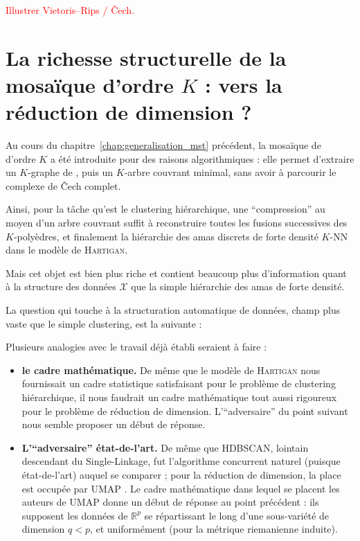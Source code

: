\textcolor{red}{Illustrer Vietoris--Rips / \v Cech.}



\section{La richesse structurelle de la mosaïque d'ordre $K$ : vers la réduction de dimension ?}
\label{sec:chapV_reduction_dimension}

Au cours du chapitre~\ref{chap:generalisation_mst} précédent, la mosaïque de  d'ordre $K$ a été introduite pour des raisons algorithmiques : elle permet d'extraire un $K$-graphe de , puis un $K$-arbre couvrant minimal, sans avoir à parcourir le complexe de \v Cech complet. 

Ainsi, pour la tâche qu'est le clustering hiérarchique, une ``compression'' au moyen d'un arbre couvrant suffit à reconstruire toutes les fusions successives des $K$-polyèdres, et finalement la hiérarchie des amas discrets de forte densité $K$-NN dans le modèle de \textsc{Hartigan}.

Mais cet objet est bien plus riche et contient beaucoup plus d'information quant à la structure des données $\mathcal X$ que la simple hiérarchie des amas de forte densité.

La question qui touche à la structuration automatique de données, champ plus vaste que le simple clustering, est la suivante :


Plusieurs analogies avec le travail déjà établi seraient à faire :
\begin{itemize}
    \item \textbf{le cadre mathématique.} De même que le modèle de \textsc{Hartigan} nous fournissait un cadre statistique satisfaisant pour le problème de clustering hiérarchique, il nous faudrait un cadre mathématique tout aussi rigoureux pour le problème de réduction de dimension. L'``adversaire'' du point suivant nous semble proposer un début de réponse.
    \item \textbf{L'``adversaire'' état-de-l'art.} De même que HDBSCAN, lointain descendant du Single-Linkage, fut l'algorithme concurrent naturel (puisque état-de-l'art) auquel se comparer ; pour la réduction de dimension, la place est occupée par UMAP \cite{Umap}. Le cadre mathématique dans lequel se placent les auteurs de UMAP donne un début de réponse au point précédent : ils supposent les données de $\mathbb R^p$ se répartissant le long d'une sous-variété de dimension $q < p$, et uniformément (pour la métrique riemanienne induite).
\end{itemize}



